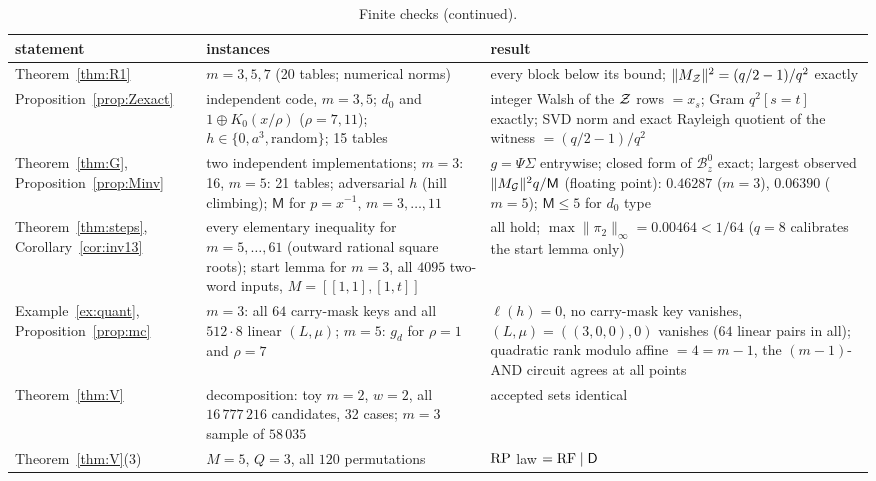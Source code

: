 \begin{table}[p]\footnotesize
\caption{Finite checks (continued).}\label{tab:finite2}
\begin{tabular}{p{}p{}p{}}
\toprule
statement & instances & result\\
\midrule
Theorem~\ref{thm:R1} & $m=3,5,7$ (20 tables; numerical norms) & every block below its bound; $\|M_{\mathcal{Z}}\|^2=(q/2-1)/q^2$ exactly\\
Proposition~\ref{prop:Zexact} & independent code, $m=3,5$; $d_0$ and $1\oplus K_0(x/\rho)$ ($\rho=7,11$); $h\in\{0,a^3,\text{random}\}$; 15 tables & integer Walsh of the $\mathcal{Z}$ rows $=x_s$; Gram $q^2[s=t]$ exactly; SVD norm and exact Rayleigh quotient of the witness $=(q/2-1)/q^2$\\
Theorem~\ref{thm:G}, Proposition~\ref{prop:Minv} & two independent implementations; $m=3$: 16, $m=5$: 21 tables; adversarial $h$ (hill climbing); $\mathsf M$ for $p=x^{-1}$, $m=3,\dots,11$ & $g=\Psi\Sigma$ entrywise; closed form of $\mathcal B^0_z$ exact; largest observed $\|M_{\mathcal{G}}\|^2q/\mathsf M$ (floating point): $0.46287$ ($m=3$), $0.06390$ ($m=5$); $\mathsf M\le5$ for $d_0$ type\\
Theorem~\ref{thm:steps}, Corollary~\ref{cor:inv13} & every elementary inequality for $m=5,\dots,61$ (outward rational square roots); start lemma for $m=3$, all $4095$ two-word inputs, $M=[[1,1],[1,t]]$ & all hold; $\max\|\pi_2\|_\infty=0.00464<1/64$ ($q=8$ calibrates the start lemma only)\\
Example~\ref{ex:quant}, Proposition~\ref{prop:mc} & $m=3$: all $64$ carry-mask keys and all $512\cdot8$ linear $(L,\mu)$; $m=5$: $g_d$ for $\rho=1$ and $\rho=7$ & $\ell(h)=0$, no carry-mask key vanishes, $(L,\mu)=((3,0,0),0)$ vanishes ($64$ linear pairs in all); quadratic rank modulo affine $=4=m-1$, the $(m-1)$-AND circuit agrees at all points\\
Theorem~\ref{thm:V} & decomposition: toy $m=2$, $w=2$, all $16\,777\,216$ candidates, 32 cases; $m=3$ sample of $58\,035$ & accepted sets identical\\
Theorem~\ref{thm:V}(3) & $M=5$, $Q=3$, all $120$ permutations & $\mathrm{RP}$ law $=\mathrm{RF}\mid\mathsf D$\\
\bottomrule
\end{tabular}
\end{table}

